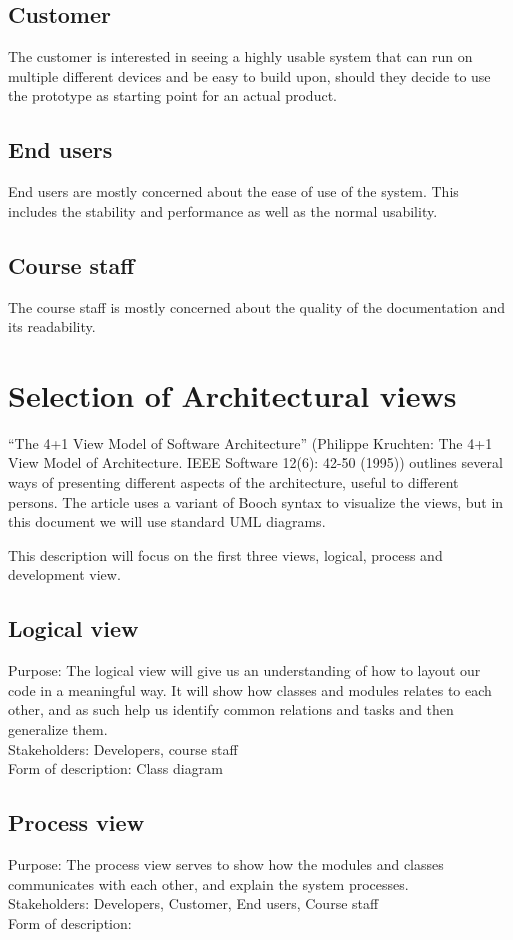 \documentclass[11pt]{book}
\begin{document}
\subsection{Customer}
The customer is interested in seeing a highly usable system that can run on multiple different devices and be easy to build upon, should they decide to use the prototype as starting point for an actual product.

\subsection{End users}
End users are mostly concerned about the ease of use of the system. This includes the stability and performance as well as the normal usability.

\subsection{Course staff}
The course staff is mostly concerned about the quality of the documentation and its readability.

\section{Selection of Architectural views}
“The 4+1 View Model of Software Architecture” (Philippe Kruchten: The 4+1 View Model of Architecture. IEEE Software 12(6): 42-50 (1995)) outlines several ways of presenting different aspects of the architecture, useful to different persons. The article uses a variant of Booch syntax to visualize the views, but in this document we will use standard UML diagrams.

This description will focus on the first three views, logical, process and development view.

\subsection{Logical view}
Purpose: The logical view will give us an understanding of how to layout our code in a meaningful way. It will show how classes and modules relates to each other, and as such help us identify common relations and tasks and then generalize them.\\
Stakeholders: Developers, course staff\\
Form of description: Class diagram

\subsection{Process view}
Purpose: The process view serves to show how the modules and classes communicates with each other, and explain the system processes.\\
Stakeholders: Developers, Customer, End users, Course staff\\
Form of description: 
\end{document}
